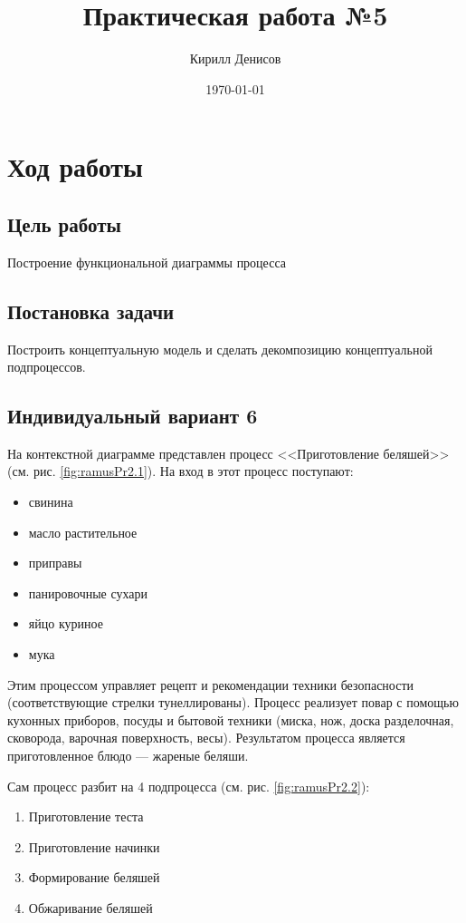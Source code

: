 \documentclass[a4paper,14pt]{extarticle}
\author{Кирилл Денисов}
\title{Практическая работа №5}
\date{\today}
\newcommand{\pathToCommonFolder}{/home/denilai/Documents/repos/latex/Common}
\begin{document}
	\thispagestyle{empty}
	
	\newpage
	\newpage
	\section*{Ход работы}
	
	
	\subsection*{Цель работы}
	Построение функциональной диаграммы процесса
		
	
	\subsection*{Постановка задачи}
	Построить концептуальную модель и сделать декомпозицию концептуальной подпроцессов.
	
	\subsection*{Индивидуальный вариант 6}
	На контекстной диаграмме представлен процесс <<Приготовление беляшей>> (см. рис. \ref{fig:ramusPr2.1}). На вход в этот процесс поступают:
	\begin{itemize}
		\item свинина
		\item масло растительное
		\item приправы
		\item панировочные сухари
		\item яйцо куриное
		\item мука
	\end{itemize}
	 Этим процессом управляет рецепт и рекомендации техники безопасности (соответствующие стрелки тунеллированы). Процесс реализует повар с помощью кухонных приборов, посуды и бытовой техники (миска, нож, доска разделочная, сковорода, варочная поверхность, весы). Результатом процесса является приготовленное блюдо --- жареные беляши.
	
	Сам процесс разбит на 4 подпроцесса (см. рис. \ref{fig:ramusPr2.2}):
	\begin{enumerate}
		\item Приготовление теста
		\item Приготовление начинки
		\item Формирование беляшей
		\item Обжаривание беляшей
	\end{enumerate}
	
\end{document}
